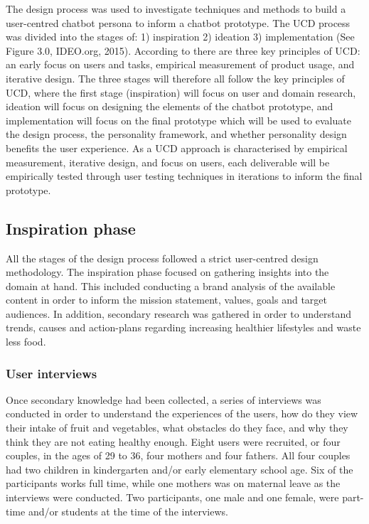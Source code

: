 The design process was used to investigate techniques and methods to build a user-centred chatbot persona to inform a chatbot prototype. The UCD process was divided into the stages of:  1) inspiration 2) ideation 3) implementation (See Figure 3.0, IDEO.org, 2015). According to \cite{Gould1985} there are three key principles of UCD: an early focus on users and tasks, empirical measurement of product usage, and iterative design. The three stages will therefore all follow the key principles of UCD, where the first stage (inspiration) will focus on user and domain research, ideation will focus on designing the elements of the chatbot prototype, and implementation will focus on the final prototype which will be used to evaluate the design process, the personality framework, and whether personality design benefits the user experience. As a UCD approach is characterised by empirical measurement, iterative design, and focus on users, each deliverable will be empirically tested through user testing techniques in iterations to inform the final prototype.


\vspace{5mm} %

\subsection{Inspiration phase}

All the stages of the design process followed a strict user-centred design methodology. The inspiration phase focused on gathering insights into the domain at hand. This included conducting a brand analysis of the available content in order to inform the mission statement, values, goals and target audiences. In addition, secondary research was gathered in order to understand trends, causes and action-plans regarding increasing healthier lifestyles and waste less food.

\vspace{2,5mm} %

    \subsubsection{User interviews}
    
    Once secondary knowledge had been collected, a series of interviews was conducted in order to understand the experiences of the users, how do they view their intake of fruit and vegetables, what obstacles do they face, and why they think they are not eating healthy enough. Eight users were recruited, or four couples, in the ages of 29 to 36, four mothers and four fathers. All four couples had two children in kindergarten and/or early elementary school age. Six of the participants works full time, while one mothers was on maternal leave as the interviews were conducted. Two participants, one male and one female, were part-time and/or students at the time of the interviews.
    
